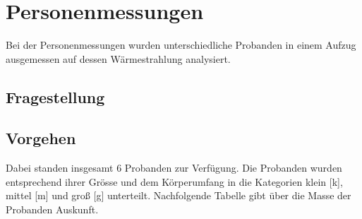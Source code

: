 \section{Personenmessungen}
Bei der Personenmessungen wurden unterschiedliche Probanden in einem Aufzug ausgemessen auf dessen Wärmestrahlung analysiert. 

\subsection{Fragestellung}




\subsection{Vorgehen}
Dabei standen insgesamt 6 Probanden zur Verfügung. Die Probanden wurden entsprechend ihrer Grösse und dem Körperumfang in die Kategorien klein [k], mittel [m] und groß [g] unterteilt. Nachfolgende Tabelle gibt über die Masse der Probanden Auskunft. 


